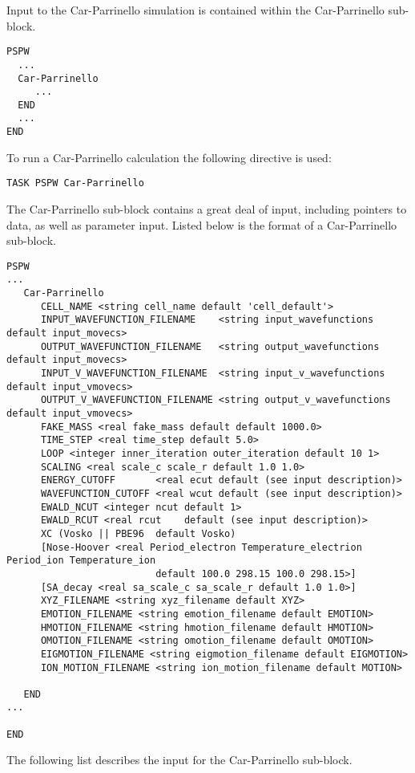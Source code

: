 Input to the Car-Parrinello simulation is contained within the
Car-Parrinello sub-block.
\begin{verbatim}
PSPW
  ...
  Car-Parrinello
     ...
  END
  ...
END
\end{verbatim}
To run a Car-Parrinello calculation the following directive is used:
\begin{verbatim}
TASK PSPW Car-Parrinello 
\end{verbatim}
The Car-Parrinello sub-block contains a great deal
of input, including pointers to data, as well as
parameter input.  Listed below is the format of a Car-Parrinello sub-block.
\begin{verbatim}
PSPW
...
   Car-Parrinello
      CELL_NAME <string cell_name default 'cell_default'>
      INPUT_WAVEFUNCTION_FILENAME    <string input_wavefunctions    default input_movecs>
      OUTPUT_WAVEFUNCTION_FILENAME   <string output_wavefunctions   default input_movecs>
      INPUT_V_WAVEFUNCTION_FILENAME  <string input_v_wavefunctions  default input_vmovecs>
      OUTPUT_V_WAVEFUNCTION_FILENAME <string output_v_wavefunctions default input_vmovecs>
      FAKE_MASS <real fake_mass default default 1000.0>
      TIME_STEP <real time_step default 5.0>
      LOOP <integer inner_iteration outer_iteration default 10 1>
      SCALING <real scale_c scale_r default 1.0 1.0>
      ENERGY_CUTOFF       <real ecut default (see input description)>
      WAVEFUNCTION_CUTOFF <real wcut default (see input description)>
      EWALD_NCUT <integer ncut default 1>
      EWALD_RCUT <real rcut    default (see input description)>
      XC (Vosko || PBE96  default Vosko)
      [Nose-Hoover <real Period_electron Temperature_electrion Period_ion Temperature_ion 
                          default 100.0 298.15 100.0 298.15>]
      [SA_decay <real sa_scale_c sa_scale_r default 1.0 1.0>]
      XYZ_FILENAME <string xyz_filename default XYZ>
      EMOTION_FILENAME <string emotion_filename default EMOTION>
      HMOTION_FILENAME <string hmotion_filename default HMOTION>
      OMOTION_FILENAME <string omotion_filename default OMOTION>
      EIGMOTION_FILENAME <string eigmotion_filename default EIGMOTION>
      ION_MOTION_FILENAME <string ion_motion_filename default MOTION>

   END
...

END
\end{verbatim}
The following list describes the input for the Car-Parrinello
sub-block.
